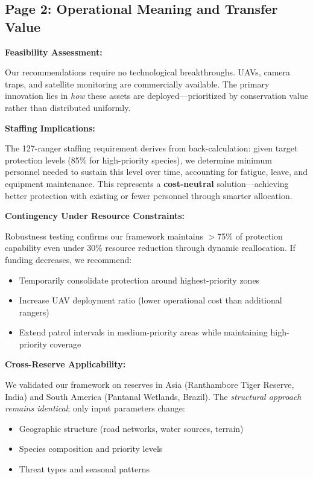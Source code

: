 \vspace{0.5cm}

\newpage

\subsection*{Page 2: Operational Meaning and Transfer Value}

\noindent \textbf{Feasibility Assessment:}

Our recommendations require no technological breakthroughs. UAVs, camera traps, and satellite monitoring are commercially available. The primary innovation lies in \textit{how} these assets are deployed—prioritized by conservation value rather than distributed uniformly.

\noindent \textbf{Staffing Implications:}

The 127-ranger staffing requirement derives from back-calculation: given target protection levels (85\% for high-priority species), we determine minimum personnel needed to sustain this level over time, accounting for fatigue, leave, and equipment maintenance. This represents a \textbf{cost-neutral} solution—achieving better protection with existing or fewer personnel through smarter allocation.

\noindent \textbf{Contingency Under Resource Constraints:}

Robustness testing confirms our framework maintains $>$75\% of protection capability even under 30\% resource reduction through dynamic reallocation. If funding decreases, we recommend:
\begin{itemize}
\item Temporarily consolidate protection around highest-priority zones
\item Increase UAV deployment ratio (lower operational cost than additional rangers)
\item Extend patrol intervals in medium-priority areas while maintaining high-priority coverage
\end{itemize}

\noindent \textbf{Cross-Reserve Applicability:}

We validated our framework on reserves in Asia (Ranthambore Tiger Reserve, India) and South America (Pantanal Wetlands, Brazil). The \textit{structural approach remains identical}; only input parameters change:
\begin{itemize}
\item Geographic structure (road networks, water sources, terrain)
\item Species composition and priority levels
\item Threat types and seasonal patterns
\end{itemize}

